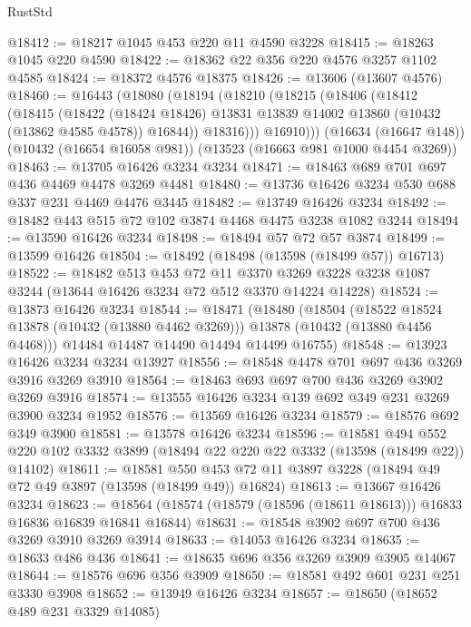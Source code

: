 \begin{lexlean}{RustStd}
\begin{coremodule}
@18412 := @18217 @1045 @453 @220 @11 @4590 @3228
@18415 := @18263 @1045 @220 @4590
@18422 := @18362 @22 @356 @220 @4576 @3257 @1102 @4585
@18424 := @18372 @4576 @18375
@18426 := @13606 (@13607 @4576)
@18460 := @16443
    (@18080
      (@18194
        (@18210
          (@18215
            (@18406
              (@18412
                (@18415
                  (@18422
                    (@18424 @18426)
                    @13831
                    @13839
                    @14002
                    @13860
                    (@10432 (@13862 @4585 @4578))
                    @16844))
                @18316)))
          @16910)))
    (@16634 (@16647 @148))
    (@10432 (@16654 @16058 @981))
    (@13523 (@16663 @981 @1000 @4454 @3269))
@18463 := @13705 @16426 @3234 @3234
@18471 := @18463 @689 @701 @697 @436 @4469 @4478 @3269 @4481
@18480 := @13736 @16426 @3234 @530 @688 @337 @231 @4469 @4476 @3445
@18482 := @13749 @16426 @3234
@18492 := @18482 @443 @515 @72 @102 @3874 @4468 @4475 @3238 @1082 @3244
@18494 := @13590 @16426 @3234
@18498 := @18494 @57 @72 @57 @3874
@18499 := @13599 @16426
@18504 := @18492 (@18498 (@13598 (@18499 @57)) @16713)
@18522 := @18482
    @513
    @453
    @72
    @11
    @3370
    @3269
    @3228
    @3238
    @1087
    @3244
    (@13644 @16426 @3234 @72 @512 @3370 @14224 @14228)
@18524 := @13873 @16426 @3234
@18544 := @18471
    (@18480
      (@18504
        (@18522 @18524 @13878 (@10432 (@13880 @4462 @3269)))
        @13878
        (@10432 (@13880 @4456 @4468)))
      @14484
      @14487
      @14490
      @14494
      @14499
      @16755)
@18548 := @13923 @16426 @3234 @3234 @13927
@18556 := @18548 @4478 @701 @697 @436 @3269 @3916 @3269 @3910
@18564 := @18463 @693 @697 @700 @436 @3269 @3902 @3269 @3916
@18574 := @13555 @16426 @3234 @139 @692 @349 @231 @3269 @3900 @3234 @1952
@18576 := @13569 @16426 @3234
@18579 := @18576 @692 @349 @3900
@18581 := @13578 @16426 @3234
@18596 := @18581
    @494
    @552
    @220
    @102
    @3332
    @3899
    (@18494 @22 @220 @22 @3332 (@13598 (@18499 @22)) @14102)
@18611 := @18581
    @550
    @453
    @72
    @11
    @3897
    @3228
    (@18494 @49 @72 @49 @3897 (@13598 (@18499 @49)) @16824)
@18613 := @13667 @16426 @3234
@18623 := @18564 (@18574 (@18579 (@18596 (@18611 @18613))) @16833 @16836 @16839 @16841 @16844)
@18631 := @18548 @3902 @697 @700 @436 @3269 @3910 @3269 @3914
@18633 := @14053 @16426 @3234
@18635 := @18633 @486 @436
@18641 := @18635 @696 @356 @3269 @3909 @3905 @14067
@18644 := @18576 @696 @356 @3909
@18650 := @18581 @492 @601 @231 @251 @3330 @3908
@18652 := @13949 @16426 @3234
@18657 := @18650 (@18652 @489 @231 @3329 @14085)

\end{coremodule}
\end{lexlean}

